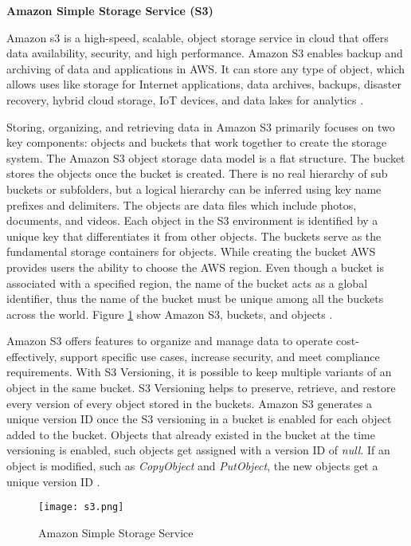 \textbf{Amazon Simple Storage Service (S3)}

\par Amazon \gls{s3} is a high-speed, scalable, object
storage
service
in cloud that offers data availability, security, and
high performance.
Amazon S3 enables backup and archiving of data and
applications in AWS. It can store any type of object,
which allows uses like storage for Internet applications, data archives, backups, disaster recovery, hybrid cloud storage, IoT devices, and data lakes for analytics \cite{39}.

\par Storing, organizing, and retrieving data in Amazon S3 primarily focuses on two key components: objects and buckets that work together to create the storage system.
The Amazon S3 object storage data model is a flat structure.
The bucket stores the objects once the bucket is created.
There is no real hierarchy of sub buckets or subfolders,
but a logical hierarchy can be inferred using key name prefixes and delimiters.
The objects are data files which include photos,
documents, and videos.
Each object in the S3 environment
is identified by a unique key that differentiates it from other objects.
The buckets serve as the fundamental storage containers for objects.
While creating the bucket AWS provides users the ability to choose the AWS region.
Even though a bucket is associated with a specified region, the name of the bucket acts as a global identifier, thus the name of the bucket must be unique among all the buckets across the world.
Figure \ref{fig:s3} show Amazon S3, buckets, and objects
\cite{40}.

\par Amazon S3 offers features to organize and manage data to operate cost-effectively, support specific use cases,
increase security, and meet compliance requirements.
With S3 Versioning, it is possible to keep multiple variants of an object in the same bucket.
S3 Versioning helps to preserve, retrieve, and restore every version of every object stored in the buckets.
Amazon S3 generates a unique version ID once the S3 versioning in a bucket is enabled for each object added to the bucket.
Objects that already existed in the bucket at the time
versioning is enabled, such objects get assigned with a
version ID of \textit{null}. If an object is modified, such as \textit{CopyObject} and \textit{PutObject}, the new objects get a unique version ID \cite{41}.

\begin{figure}
    \centering
    \texttt{[image: s3.png]}
    \caption{Amazon Simple Storage Service}{\cite{42}}
    \label{fig:s3}
\end{figure}

